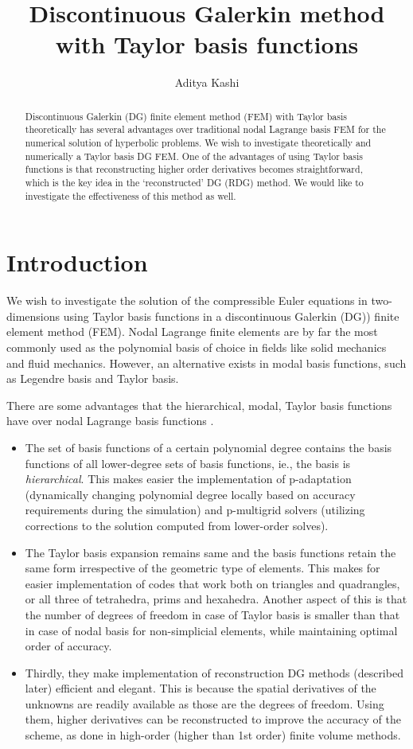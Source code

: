 \documentclass[11pt]{article}
\title{Discontinuous Galerkin method with Taylor basis functions}
\author{Aditya Kashi}
\begin{document}
\maketitle
\begin{abstract}
Discontinuous Galerkin (DG) finite element method (FEM) with Taylor basis theoretically has several advantages over traditional nodal Lagrange basis FEM for the numerical solution of hyperbolic problems. We wish to investigate theoretically and numerically a Taylor basis DG FEM. One of the advantages of using Taylor basis functions is that reconstructing higher order derivatives becomes straightforward, which is the key idea in the `reconstructed' DG (RDG) method. We would like to investigate the effectiveness of this method as well.
\end{abstract}

\section{Introduction}
We wish to investigate the solution of the compressible Euler equations in two-dimensions using Taylor basis functions in a discontinuous Galerkin (DG)) finite element method (FEM). Nodal Lagrange finite elements are by far the most commonly used as the polynomial basis of choice in fields like solid mechanics and fluid mechanics. However, an alternative exists in modal basis functions, such as Legendre basis and Taylor basis.

There are some advantages that the hierarchical, modal, Taylor basis functions have over nodal Lagrange basis functions \cite{luo_taylor, aizinger_scaleseparation}. 
\begin{itemize}
\item The set of basis functions of a certain polynomial degree contains the basis functions of all lower-degree sets of basis functions, ie., the basis is \emph{hierarchical}. This makes easier the implementation of p-adaptation (dynamically changing polynomial degree locally based on accuracy requirements during the simulation) and p-multigrid solvers (utilizing corrections to the solution computed from lower-order solves).
\item The Taylor basis expansion remains same and the basis functions retain the same form irrespective of the geometric type of elements. This makes for easier implementation of codes that work both on triangles and quadrangles, or all three of tetrahedra, prims and hexahedra. Another aspect of this is that the number of degrees of freedom in case of Taylor basis is smaller than that in case of nodal basis for non-simplicial elements, while maintaining optimal order of accuracy.
\item Thirdly, they make implementation of reconstruction DG methods (described later) efficient and elegant. This is because the spatial derivatives of the unknowns are readily available as those are the degrees of freedom. Using them, higher derivatives can be reconstructed to improve the accuracy of the scheme, as done in high-order (higher than 1st order) finite volume methods.
\end{itemize}
\end{document}
